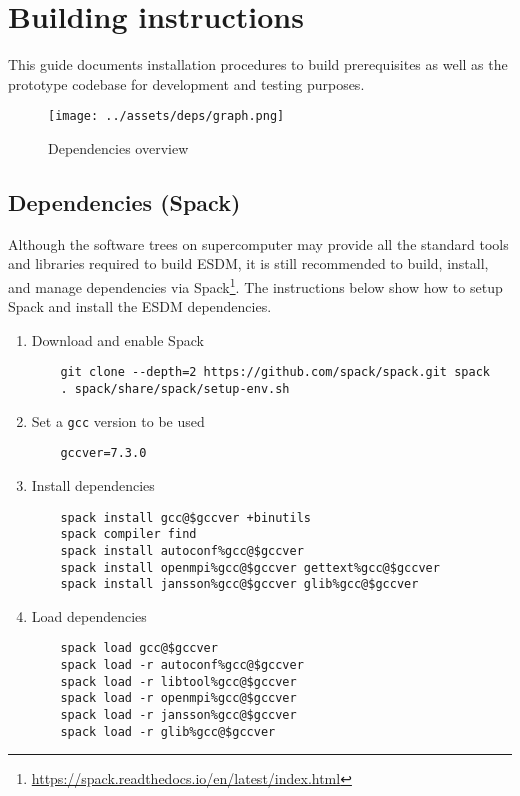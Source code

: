 \section{Building instructions}%
\label{installation-instructions-for-mistral}
This guide documents installation procedures to build prerequisites as well as the prototype codebase for development and testing purposes.

\begin{figure}[!ht]
  \begin{center}
    \texttt{[image: ../assets/deps/graph.png]}
  \end{center}
  \caption{Dependencies overview}
  \label{fig:deps}
\end{figure}

\subsection{Dependencies (Spack)}%
\label{satisfying-requirements}
Although the software trees on supercomputer may provide all the standard tools and libraries required to build ESDM, it is still recommended to build, install, and manage dependencies via Spack\footnote{\url{https://spack.readthedocs.io/en/latest/index.html}}.
The instructions below show how to setup Spack and install the ESDM dependencies.

\begin{enumerate}
  \item Download and enable Spack
    \begin{lstlisting}
    git clone --depth=2 https://github.com/spack/spack.git spack
    . spack/share/spack/setup-env.sh
    \end{lstlisting}
  \item Set a \lstinline|gcc| version to be used
    \begin{lstlisting}
    gccver=7.3.0
    \end{lstlisting}
  \item Install dependencies
    \begin{lstlisting}
    spack install gcc@$gccver +binutils
    spack compiler find
    spack install autoconf%gcc@$gccver
    spack install openmpi%gcc@$gccver gettext%gcc@$gccver
    spack install jansson%gcc@$gccver glib%gcc@$gccver
    \end{lstlisting}
  \item Load dependencies
    \begin{lstlisting}
    spack load gcc@$gccver
    spack load -r autoconf%gcc@$gccver
    spack load -r libtool%gcc@$gccver
    spack load -r openmpi%gcc@$gccver
    spack load -r jansson%gcc@$gccver
    spack load -r glib%gcc@$gccver
    \end{lstlisting}
\end{enumerate}


